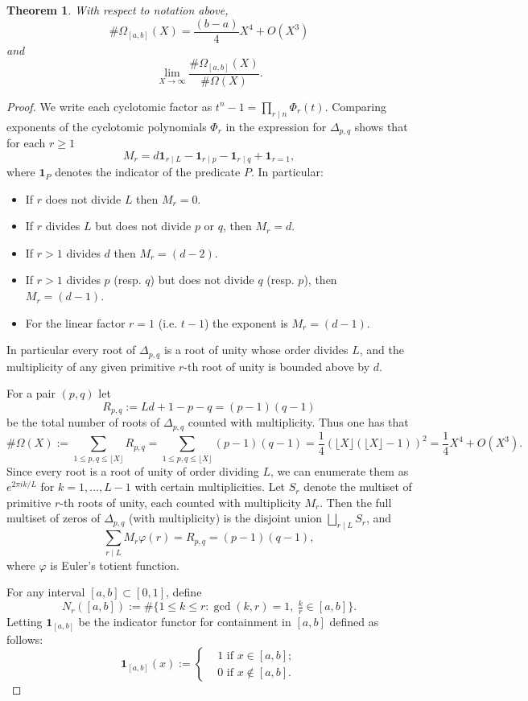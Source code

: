 \documentclass[table]{amsart}
\newtheorem{theorem}{Theorem}[section]
\numberwithin{equation}{section}
\begin{document}
\begin{theorem}\label{section 3 main thm 2}
    With respect to notation above, 
\begin{equation}\label{Omega asymptotic 1}\#\Omega_{[a,b]}(X)=\frac{(b-a)}{4} X^4+O(X^3)\end{equation}\noindent and\begin{equation}\label{Omega asymptotic 2}\lim_{X\rightarrow \infty} \frac{\#\Omega_{[a,b]}(X)}{\#\Omega(X)}.\end{equation}
\end{theorem}
\begin{proof}
\par We write each cyclotomic factor as \(t^n-1=\prod_{r\mid n}\Phi_r(t)\). Comparing exponents of the cyclotomic polynomials \(\Phi_r\) in the expression for \(\Delta_{p,q}\) shows that for each \(r\ge1\)
\[
M_r= d \mathbf{1}_{r\mid L}-\mathbf{1}_{r\mid p}-\mathbf{1}_{r\mid q} + \mathbf{1}_{r=1},
\]
where \(\mathbf{1}_{P}\) denotes the indicator of the predicate \(P\). In particular:
\begin{itemize}
    \item If $r$ does not divide $L$ then $M_r=0$.
 \item If $r$ divides $L$ but does not divide $p$ or $q$, then $M_r=d$.
  \item If \(r>1\) divides \(d\) then
  \(M_r=(d-2)\).
  \item If \(r>1\) divides $p$ (resp. $q$) but does not divide $q$ (resp. $p$), then \(M_r=(d-1)\).
  \item For the linear factor \(r=1\) (i.e. \(t-1\)) the exponent is \(M_r=(d-1)\).
\end{itemize}
In particular every root of \(\Delta_{p,q}\) is a root of unity whose order divides \(L\), and the multiplicity of any given primitive \(r\)-th root of unity is bounded above by \(d\). 
\par For a pair \((p,q)\) let
\[R_{p,q}:=Ld+1-p-q=(p-1)(q-1)\] be the total number of roots of \(\Delta_{p,q}\) counted with multiplicity. Thus one has that
\[
\#\Omega(X):=\sum_{1\le p,q\le\lfloor X\rfloor} R_{p,q}=\sum_{1\le p,q\le\lfloor X\rfloor} (p-1)(q-1)=\frac{1}{4}\left(\lfloor X\rfloor(\lfloor X\rfloor-1)\right)^2=\frac{1}{4}X^4+O(X^3).
\]
Since every root is a root of unity of order dividing \(L\),
we can enumerate them as \(e^{2\pi i k/L}\) for \(k=1,\dots,L-1\) with certain multiplicities. Let $S_r$ denote the multiset of primitive $r$-th roots of unity, each counted with multiplicity $M_r$.  Then the full multiset of zeros of $\Delta_{p,q}$ (with multiplicity) is the disjoint union $\bigsqcup_{r\mid L} S_r$, and 
\[\sum_{r\mid L} M_r\varphi(r)
=R_{p,q}=(p-1)(q-1),
\]
where $\varphi$ is Euler's totient function.
\par For any interval $[a,b]\subset[0,1]$, define
\[
N_r([a,b]) := \#\{1\le k\le r : \gcd(k,r)=1,\ \tfrac{k}{r}\in[a,b]\}.
\]
Letting $\mathbf{1}_{[a,b]}$ be the indicator functor for containment in $[a,b]$ defined as follows:
\[\mathbf{1}_{[a,b]}(x):=\begin{cases}
    & 1\text{ if }x\in [a,b];\\
    & 0\text{ if }x\notin [a,b].
\end{cases}\]


\end{proof}
\end{document}

